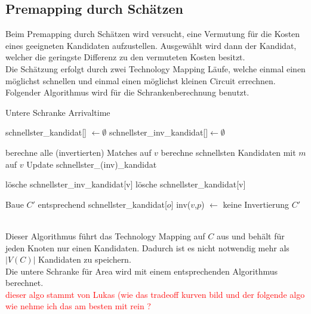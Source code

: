 \documentclass[11pt, a4paper, german]{article}
\newcommand{\TM}{Technology  Mapping }
\begin{document}
\subsection{Premapping durch Schätzen}
\label{subsec:premapping_duch_schaetzen}
 Beim Premapping durch Schätzen wird versucht, eine Vermutung für die Kosten eines geeigneten Kandidaten aufzustellen. Ausgewählt wird dann der Kandidat, welcher die geringste Differenz zu den vermuteten Kosten besitzt.\\
Die Schätzung erfolgt durch zwei \TM Läufe, welche einmal einen möglichst schnellen und einmal einen möglichst kleinen Circuit errechnen. Folgender Algorithmus wird für die Schrankenberechnung benutzt.\\
 
\begin{algorithm}[H]
 \LinesNumbered
 \DontPrintSemicolon
 \caption{Untere Schranke Arrivaltime}

 schnellster\_kandidat[] $\gets \emptyset$\;
 schnellster\_inv\_kandidat[]$ \gets \emptyset$\;
 {
   berechne alle (invertierten) Matches auf $v$\;
   {
      berechne schnellsten Kandidaten mit $m$ auf $v$\;
      Update schnellster\_(inv)\_kandidat\;
   }
   {
      
      {
	l\"osche schnellster\_inv\_kandidat[v]\;
      }
      \Else
      {
	l\"osche schnellster\_kandidat[v]\;
      }
   }
 }
 Baue $C'$ entsprechend schnellster\_kandidat[$o$]\;
 {
    {
      {
	inv($v$,$p$) $\gets$ keine Invertierung\;
      }
    }
 }
 \Return $C'$\;
\end{algorithm}\ \\

 Dieser Algorithmus führt das \TM auf $C$ aus und behält für jeden Knoten nur einen Kandidaten. Dadurch ist es nicht notwendig mehr als $|V(C)|$ Kandidaten zu speichern. \\
 Die untere Schranke für Area wird mit einem entsprechenden Algorithmus berechnet. \\
 \textcolor{red}{dieser algo stammt von Lukas (wie das tradeoff kurven bild und der folgende algo wie nehme ich das am besten mit rein ?}\\
\end{document}
